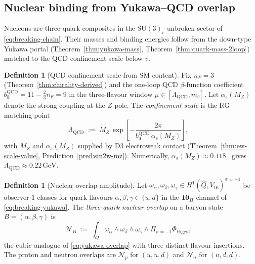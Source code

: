 \documentclass[aps,prd,onecolumn,amsmath,amssymb,nofootinbib,11pt]{revtex4-2}
\numberwithin{equation}{section}
\theoremstyle{plain}
\theoremstyle{definition}
\newtheorem{definition}[theorem]{Definition}
\theoremstyle{remark}
\begin{document}
\subsection{Nuclear binding from Yukawa--QCD overlap}
\label{sec:nuclear:binding}

Nucleons are three-quark composites in the $\mathrm{SU}(3)_c$-unbroken sector
of \eqref{eq:breaking-chain}. Their masses and binding energies follow from
the down-type Yukawa portal (Theorem~\ref{thm:yukawa-mass},
Theorem~\ref{thm:quark-mass-2loop}) matched to the QCD confinement scale
below $v$.

\begin{definition}[QCD confinement scale from SM content]
\label{def:lambda-qcd}
Fix $n_F=3$ (Theorem~\ref{thm:chirality-derived}) and the one-loop QCD
$\beta$-function coefficient $b_0^{\mathrm{QCD}}=11-\tfrac{2}{3}n_F=9$ in the
three-flavour window $\mu\in[\Lambda_{\mathrm{QCD}},m_b]$. Let
$\alpha_s(M_Z)$ denote the strong coupling at the $Z$ pole. The
\emph{confinement scale} is the RG matching point
\begin{equation}\label{eq:lambda-qcd}
  \Lambda_{\mathrm{QCD}}
  \;:=\;
  M_Z\,
  \exp\!\left[-\frac{2\pi}{b_0^{\mathrm{QCD}}\,\alpha_s(M_Z)}\right],
\end{equation}
with $M_Z$ and $\alpha_s(M_Z)$ supplied by D3 electroweak contact
(Theorem~\ref{thm:ew-scale-value}, Prediction~\ref{pred:sin2w-mz}). Numerically,
$\alpha_s(M_Z)\approx 0.118$~\cite{PDG2025} gives
$\Lambda_{\mathrm{QCD}}\approx 0.22\,\mathrm{GeV}$.
\end{definition}

\begin{definition}[Nuclear overlap amplitude]\label{def:nuclear-overlap}
Let $\omega_\alpha,\omega_\beta,\omega_\gamma\in
H^1(\hat Q,V_{16})^{\sigma=-1}$ be observer $1$-classes for quark flavours
$\alpha,\beta,\gamma\in\{u,d\}$ in the $\mathbf{10}_H$ channel of
\eqref{eq:breaking-yukawa}. The \emph{three-quark nuclear overlap} on a
baryon state $B=(\alpha,\beta,\gamma)$ is
\begin{equation}\label{eq:nuclear-overlap}
  \mathcal{N}_B
  \;:=\;
  \int_{\hat Q}
  \omega_\alpha\wedge\omega_\beta\wedge\omega_\gamma
  \wedge\Pi_{\sigma=-1}\Phi_{\mathrm{Higgs}},
\end{equation}
the cubic analogue of \eqref{eq:yukawa-overlap} with three distinct flavour
insertions. The proton and neutron overlaps are $\mathcal{N}_p$ for
$(u,u,d)$ and $\mathcal{N}_n$ for $(u,d,d)$.
\end{definition}
\end{document}
